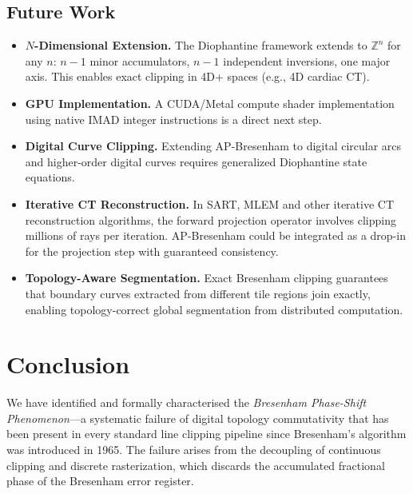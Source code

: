 \documentclass[12pt,a4paper]{article}
\theoremstyle{definition}
\newcommand{\Z}{\mathbb{Z}}
\begin{document}
\subsection{Future Work}

\begin{itemize}
  \item[\textbf{F1.}] \textbf{$N$-Dimensional Extension.}
    The Diophantine framework extends to $\Z^n$ for any
    $n$: $n-1$ minor accumulators, $n-1$ independent
    inversions, one major axis. This enables exact clipping
    in 4D+ spaces (e.g., 4D cardiac CT).
  \item[\textbf{F2.}] \textbf{GPU Implementation.}
    A CUDA/Metal compute shader implementation using native
    IMAD integer instructions is a direct next step.
  \item[\textbf{F3.}] \textbf{Digital Curve Clipping.}
    Extending AP-Bresenham to digital circular
    arcs~\cite{andres1994discrete} and higher-order digital
    curves requires generalized Diophantine state equations.
  \item[\textbf{F4.}] \textbf{Iterative CT Reconstruction.}
    In SART, MLEM and other iterative CT reconstruction
    algorithms, the forward projection operator involves
    clipping millions of rays per iteration. AP-Bresenham
    could be integrated as a drop-in for the projection
    step with guaranteed consistency.
  \item[\textbf{F5.}] \textbf{Topology-Aware Segmentation.}
    Exact Bresenham clipping guarantees that boundary curves
    extracted from different tile regions join exactly,
    enabling topology-correct global segmentation from
    distributed computation.
\end{itemize}

\section{Conclusion}
\label{sec:conclusion}

We have identified and formally characterised the
\emph{Bresenham Phase-Shift Phenomenon}---a systematic
failure of digital topology commutativity that has been
present in every standard line clipping pipeline since
Bresenham's algorithm was introduced in 1965. The failure
arises from the decoupling of continuous clipping and
discrete rasterization, which discards the accumulated
fractional phase of the Bresenham error register.
\end{document}
